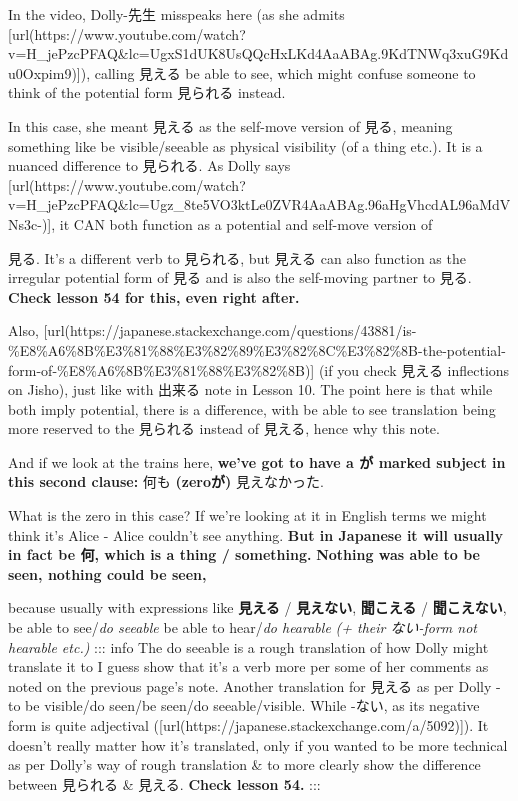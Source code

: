 In the video, Dolly-先生 misspeaks here (as she admits [url(https://www.youtube.com/watch?v=H_jePzcPFAQ&lc=UgxS1dUK8UsQQcHxLKd4AaABAg.9KdTNWq3xuG9Kdu0Oxpim9)]), calling 見える be able to see, which might confuse someone to think of the potential form 見られる instead.

\thinrule

In this case, she meant 見える as the self-move version of 見る, meaning something like be visible/seeable as physical visibility (of a thing etc.). It is a nuanced difference to 見られる.\crlf
As Dolly says [url(https://www.youtube.com/watch?v=H_jePzcPFAQ&lc=Ugz_8te5VO3ktLe0ZVR4AaABAg.96aHgVhcdAL96aMdVNs3c-)], it CAN both function as a potential and self-move version of

見る. It's a different verb to 見られる, but 見える can also function as the irregular potential form of 見る and is also the self-moving partner to 見る. {\bf Check lesson 54 for this, even right after.}

Also, [url(https://japanese.stackexchange.com/questions/43881/is-\%E8\%A6\%8B\%E3\%81\%88\%E3\%82\%89\%E3\%82\%8C\%E3\%82\%8B-the-potential-form-of-\%E8\%A6\%8B\%E3\%81\%88\%E3\%82\%8B)] (if you check 見える inflections on Jisho), just like with 出来る note in Lesson 10.\crlf
The point here is that while both imply potential, there is a difference, with be able to see translation being more reserved to the 見られる instead of 見える, hence why this note.

And if we look at the trains here, {\bf we've got to have a が marked subject in this second clause:} 何も {\bf (zeroが)} 見えなかった.

{}

What is the zero in this case? If we're looking at it in English terms we might think it's Alice - Alice couldn't see anything. {\bf But in Japanese it will usually in fact be 何, which is a thing / something.} {\bf Nothing was able to be seen, nothing could be seen,}

\thinrule

because usually with expressions like {\bf 見える} / {\bf 見えない}, {\bf 聞こえる} / {\bf 聞こえない}, be able to see/{\em do seeable} be able to hear/{\em do hearable} {\em (+ their ない-form not hearable etc.)}\crlf
::: info The do seeable is a rough translation of how Dolly might translate it to I guess show that it's a verb more per some of her comments as noted on the previous page's note.\crlf
Another translation for 見える as per Dolly - to be visible/do seen/be seen/do seeable/visible.\crlf
While -ない, as its negative form is quite adjectival ([url(https://japanese.stackexchange.com/a/5092)]). It doesn't really matter how it's translated, only if you wanted to be more technical as per Dolly's way of rough translation & to more clearly show the difference between 見られる & 見える. {\bf Check lesson 54.} :::

